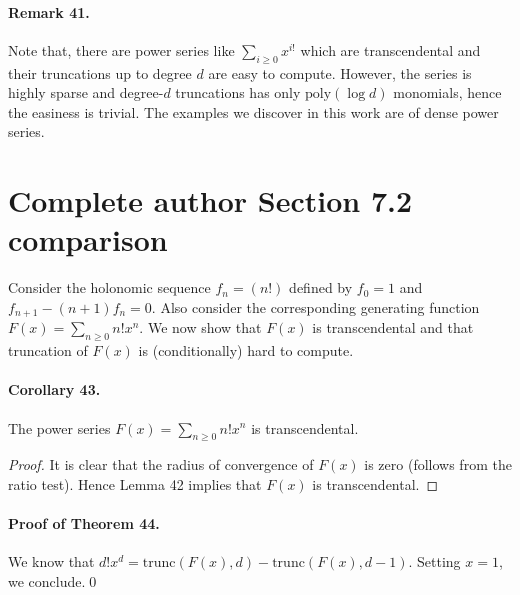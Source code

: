 \documentclass[10pt,a4paper]{article}
\begin{document}
\paragraph{Remark 41.} Note that, there are power series like $\sum_{i\ge0}x^{i!}$ which are transcendental and their truncations up to degree $d$ are easy to compute. However, the series is highly sparse and degree-$d$ truncations has only $\mathrm{poly}(\log d)$ monomials, hence the easiness is trivial. The examples we discover in this work are of dense power series.
\section*{Complete author Section 7.2 comparison}
Consider the holonomic sequence $f_n=(n!)$ defined by $f_0=1$ and $f_{n+1}-(n+1)f_n=0$. Also consider the corresponding generating function $F(x)=\sum_{n\ge0}n!x^n$. We now show that $F(x)$ is transcendental and that truncation of $F(x)$ is (conditionally) hard to compute.
\paragraph{Corollary 43.} The power series $F(x)=\sum_{n\ge0}n!x^n$ is transcendental.
\begin{proof}It is clear that the radius of convergence of $F(x)$ is zero (follows from the ratio test). Hence Lemma 42 implies that $F(x)$ is transcendental.\end{proof}
\paragraph{Proof of Theorem 44.} We know that $d!x^d=\mathrm{trunc}(F(x),d)-\mathrm{trunc}(F(x),d-1)$. Setting $x=1$, we conclude.\qed
\end{document}

